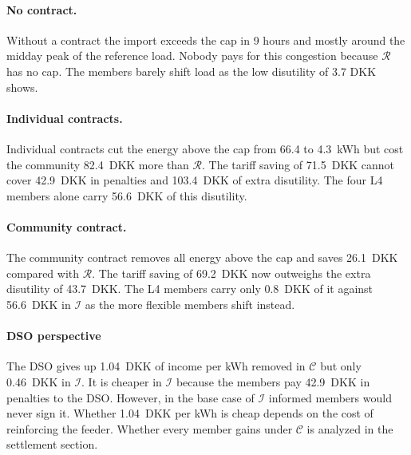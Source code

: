 \paragraph{No contract.}
Without a contract the import exceeds the cap in 9 hours and mostly around the midday peak of the reference load.
Nobody pays for this congestion because $\mathcal{R}$ has no cap.
The members barely shift load as the low disutility of 3.7 DKK shows.

\paragraph{Individual contracts.}
Individual contracts cut the energy above the cap from 66.4 to 4.3~kWh but cost the community 82.4~DKK more than $\mathcal{R}$.
The tariff saving of 71.5~DKK cannot cover 42.9~DKK in penalties and 103.4~DKK of extra disutility. The four L4 members alone carry 56.6~DKK of this disutility.

\paragraph{Community contract.}
The community contract removes all energy above the cap and saves 26.1~DKK compared with $\mathcal{R}$.
The tariff saving of 69.2~DKK now outweighs the extra disutility of 43.7~DKK.
The L4 members carry only 0.8~DKK of it against 56.6~DKK in $\mathcal{I}$ as the more flexible members shift instead.


\paragraph{DSO perspective}
The DSO gives up 1.04~DKK of income per kWh removed in $\mathcal{C}$ but only 0.46~DKK in $\mathcal{I}$. It is cheaper in $\mathcal{I}$ because the members pay 42.9~DKK in penalties to the DSO. However, in the base case of $\mathcal{I}$ informed members would never sign it. Whether 1.04~DKK per kWh is cheap depends on the cost of reinforcing the feeder. Whether every member gains under $\mathcal{C}$ is analyzed in the settlement section.


